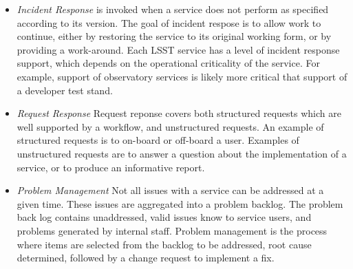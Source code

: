 \begin{enumerate}
\begin{itemize}
  \item \emph{Incident Response} is invoked when a service does not
  perform as specified according to its version.  The goal of
  incident respose is to allow work to continue, either by
  restoring the service to its original working form, or by providing
  a work-around.  Each LSST service has a level of incident
  response support, which depends on the operational criticality of the service.  For
  example, support of observatory services is likely more critical that support
  of a developer test stand.

  \item \emph{Request Response} Request reponse covers both structured
  requests which are well supported by a workflow, and unstructured
  requests.  An example of structured requests is to on-board or
  off-board a user. Examples of unstructured requests are to answer a
  question about the implementation of a service, or to produce an
  informative report.

  \item \emph{Problem Management} Not all issues with a service can be
  addressed at a given time. These issues are aggregated into a problem
  backlog. The problem back log contains unaddressed, valid issues
  know to service users, and problems generated by internal staff.
  Problem management is the process where items are selected from the
  backlog to be addressed, root cause determined, followed by a change
  request to implement a fix.

  \end{itemize}

\end{enumerate}
